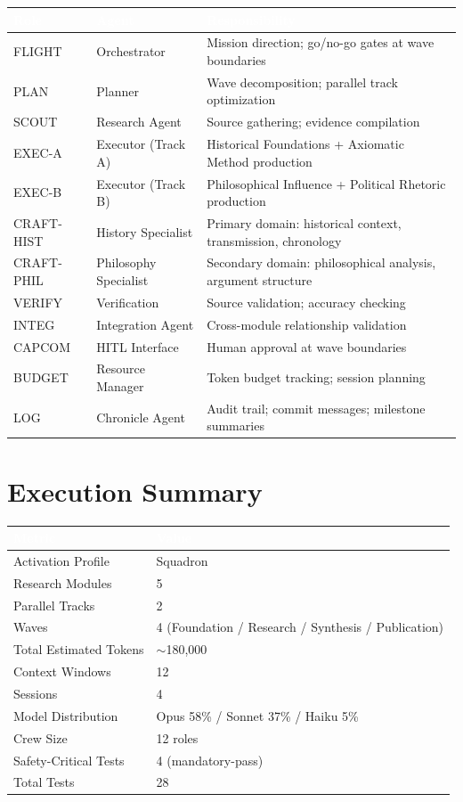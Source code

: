 \documentclass[11pt,letterpaper]{article}
\newcommand{\tableheader}[1]{\textbf{\sffamily\textcolor{white}{#1}}}
\begin{document}
\begin{center}
\begin{tabularx}{\textwidth}{L{2cm}L{3cm}X}
\toprule
{}
\tableheader{Role} & \tableheader{Agent} & \tableheader{Responsibility} \\
\midrule
FLIGHT & Orchestrator & Mission direction; go/no-go gates at wave boundaries \\
PLAN & Planner & Wave decomposition; parallel track optimization \\
SCOUT & Research Agent & Source gathering; evidence compilation \\
EXEC-A & Executor (Track A) & Historical Foundations + Axiomatic Method production \\
EXEC-B & Executor (Track B) & Philosophical Influence + Political Rhetoric production \\
CRAFT-HIST & History Specialist & Primary domain: historical context, transmission, chronology \\
CRAFT-PHIL & Philosophy Specialist & Secondary domain: philosophical analysis, argument structure \\
VERIFY & Verification & Source validation; accuracy checking \\
INTEG & Integration Agent & Cross-module relationship validation \\
CAPCOM & HITL Interface & Human approval at wave boundaries \\
BUDGET & Resource Manager & Token budget tracking; session planning \\
LOG & Chronicle Agent & Audit trail; commit messages; milestone summaries \\
\bottomrule
\end{tabularx}
\end{center}

\section{Execution Summary}

\begin{center}
\begin{tabularx}{\textwidth}{L{5cm}X}
\toprule
{}
\tableheader{Metric} & \tableheader{Value} \\
\midrule
Activation Profile & Squadron \\
Research Modules & 5 \\
Parallel Tracks & 2 \\
Waves & 4 (Foundation / Research / Synthesis / Publication) \\
Total Estimated Tokens & $\sim$180,000 \\
Context Windows & 12 \\
Sessions & 4 \\
Model Distribution & Opus 58\% / Sonnet 37\% / Haiku 5\% \\
Crew Size & 12 roles \\
Safety-Critical Tests & 4 (mandatory-pass) \\
Total Tests & 28 \\
\bottomrule
\end{tabularx}
\end{center}
\end{document}
